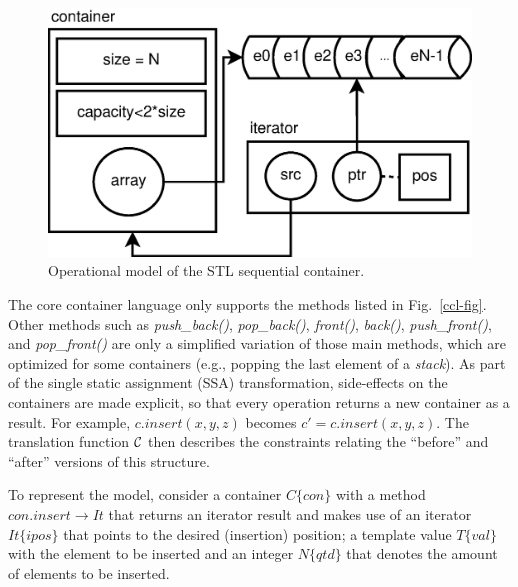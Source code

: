 \documentclass[conference]{IEEEtran}
\begin{document}
\begin{figure}[ht] \centering
\includegraphics[scale=0.3]{figures/stl-iterator}
\caption{Operational model of the STL sequential container.}
\label{figure:stl-iterator}
\end{figure}



The core container language only supports the methods listed in Fig.~\ref{ccl-fig}.
Other methods such as \emph{push\_back()}, \emph{pop\_back()}, \emph{front()},
\emph{back()}, \emph{push\_front()}, and \emph{pop\_front()} are only
a simplified variation of those main methods, which are optimized for some containers
(e.g., popping the last element of a \textit{stack}).
As part of the single static assignment (SSA) transformation, side-effects on the containers
are made explicit, so that every operation returns a new container as a result. For example,
$\mathit{c.insert\left(x,y,z\right)}$ becomes $\mathit{c' = c.insert\left(x,y,z\right)}$.
The translation function $\cal C$ then describes the constraints relating the ``before''
and ``after'' versions of this structure.

To represent the model, consider a container $C\{\mathit{con}\}$ with a
method $\mathit{con.insert} \rightarrow It$ that returns an iterator result and
makes use of an iterator $It\{ipos\}$ that points to the desired
(insertion) position; a template value $T\{val\}$ with the element
to be inserted and an integer $N\{qtd\}$ that denotes the amount
of elements to be inserted.
\end{document}
